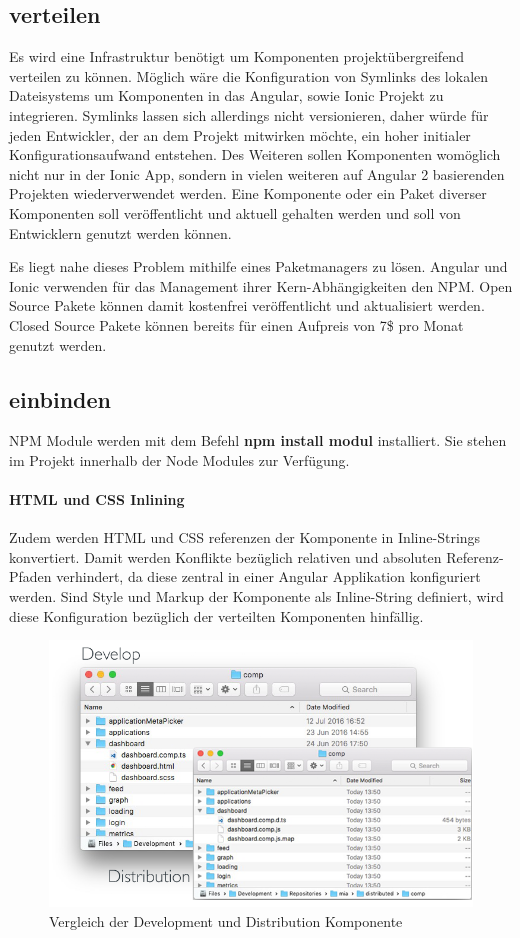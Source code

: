 \subsection{verteilen}

Es wird eine Infrastruktur benötigt um Komponenten projektübergreifend verteilen zu können.
Möglich wäre die Konfiguration von Symlinks des lokalen Dateisystems um Komponenten in das Angular,
sowie Ionic Projekt zu integrieren. Symlinks lassen sich allerdings nicht versionieren, daher würde
für jeden Entwickler, der an dem Projekt mitwirken möchte,
ein hoher initialer Konfigurationsaufwand entstehen.
Des Weiteren sollen Komponenten womöglich nicht nur in der Ionic App,
sondern in vielen weiteren auf Angular 2 basierenden Projekten wiederverwendet werden.
Eine Komponente oder ein Paket diverser Komponenten soll veröffentlicht und aktuell
gehalten werden und soll von Entwicklern genutzt werden können.

Es liegt nahe dieses Problem mithilfe eines Paketmanagers zu lösen. Angular und Ionic verwenden für das Management
ihrer Kern-Abhängigkeiten den \ac{NPM}.
Open Source Pakete können damit kostenfrei veröffentlicht und aktualisiert werden. Closed Source Pakete können
bereits für einen Aufpreis von 7\$ pro Monat genutzt werden.


\subsection{einbinden}

\ac{NPM} Module werden mit dem Befehl \textbf{npm install modul} installiert.
Sie stehen im Projekt innerhalb der Node Modules zur Verfügung.






\paragraph{HTML und CSS Inlining}
Zudem werden \ac{HTML} und \ac{CSS} referenzen der Komponente in Inline-Strings konvertiert.
Damit werden Konflikte bezüglich relativen und absoluten Referenz-Pfaden verhindert,
da diese zentral in einer Angular Applikation konfiguriert werden.
Sind Style und Markup der Komponente als Inline-String definiert,
wird diese Konfiguration bezüglich der verteilten Komponenten hinfällig.
\cite{ludoh30:online}

\begin{figure}[h]
 \centering
 \includegraphics[width=\linewidth]{kapitel3/prepare-distribution-comp.png}
 \caption{Vergleich der Development und Distribution Komponente}
\end{figure}
\vspace{0.3cm}
